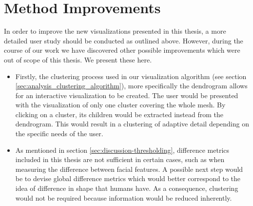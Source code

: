 \section{Method Improvements}

In order to improve the new visualizations presented in this thesis, a more detailed user study should be conducted as outlined above. However, during the course of our work we have discovered other possible improvements which were out of scope of this thesis. We present these here.

\begin{itemize}
	\item Firstly, the clustering process used in our visualization algorithm (see section \ref{sec:analysis_clustering_algorithm}), more specifically the dendrogram allows for an interactive visualization to be created. The user would be presented with the visualization of only one cluster covering the whole mesh. By clicking on a cluster, its children would be extracted instead from the dendrogram. This would result in a clustering of adaptive detail depending on the specific needs of the user.
	\item As mentioned in section \ref{sec:discussion-thresholding}, difference metrics included in this thesis are not sufficient in certain cases, such as when measuring the difference between facial features. A possible next step would be to devise global difference metrics which would better correspond to the idea of difference in shape that humans have. As a consequence, clustering would not be required because information would be reduced inherently.
\end{itemize}
